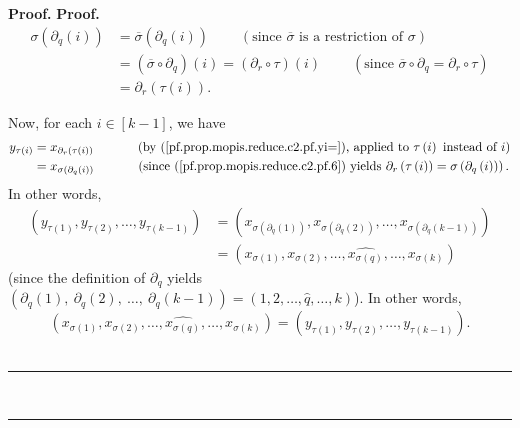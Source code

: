 \documentclass[numbers=enddot,12pt,final,onecolumn,notitlepage]{scrartcl}%
\theoremstyle{definition}
\newenvironment{fineprint}{\begin{small}}{\end{small}}
\newenvironment{proof}[1][Proof]{\noindent\textbf{#1.} }{\ \rule{0.5em}{0.5em}}
\begin{document}
\begin{fineprint}
\begin{proof}
\begin{proof}
\begin{align}
\sigma\left(  \partial_{q}\left(  i\right)  \right)   &  =\overline{\sigma
}\left(  \partial_{q}\left(  i\right)  \right)  \ \ \ \ \ \ \ \ \ \ \left(
\text{since }\overline{\sigma}\text{ is a restriction of }\sigma\right)
\nonumber\\
&  =\left(  \overline{\sigma}\circ\partial_{q}\right)  \left(  i\right)
=\left(  \partial_{r}\circ\tau\right)  \left(  i\right)
\ \ \ \ \ \ \ \ \ \ \left(  \text{since }\overline{\sigma}\circ\partial
_{q}=\partial_{r}\circ\tau\right) \nonumber\\
&  =\partial_{r}\left(  \tau\left(  i\right)  \right)  .
\label{pf.prop.mopis.reduce.c2.pf.6}%
\end{align}


Now, for each $i\in\left[  k-1\right]  $, we have%
\begin{align*}
y_{\tau\left(  i\right)  }  &  =x_{\partial_{r}\left(  \tau\left(  i\right)
\right)  }\ \ \ \ \ \ \ \ \ \ \left(  \text{by
(\ref{pf.prop.mopis.reduce.c2.pf.yi=}), applied to }\tau\left(  i\right)
\text{ instead of }i\right) \\
&  =x_{\sigma\left(  \partial_{q}\left(  i\right)  \right)  }%
\ \ \ \ \ \ \ \ \ \ \left(  \text{since (\ref{pf.prop.mopis.reduce.c2.pf.6})
yields }\partial_{r}\left(  \tau\left(  i\right)  \right)  =\sigma\left(
\partial_{q}\left(  i\right)  \right)  \right)  .
\end{align*}
In other words,%
\begin{align*}
\left(  y_{\tau\left(  1\right)  },y_{\tau\left(  2\right)  },\ldots
,y_{\tau\left(  k-1\right)  }\right)   &  =\left(  x_{\sigma\left(
\partial_{q}\left(  1\right)  \right)  },x_{\sigma\left(  \partial_{q}\left(
2\right)  \right)  },\ldots,x_{\sigma\left(  \partial_{q}\left(  k-1\right)
\right)  }\right) \\
&  =\left(  x_{\sigma\left(  1\right)  },x_{\sigma\left(  2\right)  }%
,\ldots,\widehat{x_{\sigma\left(  q\right)  }},\ldots,x_{\sigma\left(
k\right)  }\right)
\end{align*}
(since the definition of $\partial_{q}$ yields $\left(  \partial_{q}\left(
1\right)  ,\ \partial_{q}\left(  2\right)  ,\ \ldots,\ \partial_{q}\left(
k-1\right)  \right)  =\left(  1,2,\ldots,\widehat{q},\ldots,k\right)  $). In
other words,%
\[
\left(  x_{\sigma\left(  1\right)  },x_{\sigma\left(  2\right)  }%
,\ldots,\widehat{x_{\sigma\left(  q\right)  }},\ldots,x_{\sigma\left(
k\right)  }\right)  =\left(  y_{\tau\left(  1\right)  },y_{\tau\left(
2\right)  },\ldots,y_{\tau\left(  k-1\right)  }\right)  .
\]
\end{proof}
\end{proof}
\end{fineprint}
\end{document}
